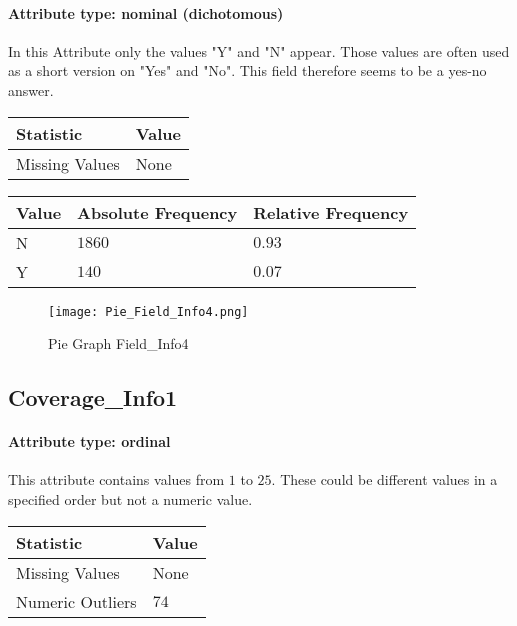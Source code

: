 \paragraph{Attribute type: nominal (dichotomous)} In this Attribute only the values "Y" and "N" appear. Those values are often used as a short version on "Yes" and "No". This field therefore seems to be a yes-no answer.
\qquad
\begin{table}[H]
	\renewcommand{\arraystretch}{1.25}
	\begin{tabular}{l|l}
		\textbf{Statistic} & \textbf{Value}\\\hline
		Missing Values& None\\\hline
	\end{tabular}
\end{table}
\begin{table}[H]
	\renewcommand{\arraystretch}{1.25}
	\begin{tabular}{l|l|l}
		\textbf{Value} & \textbf{Absolute Frequency} & \textbf{Relative Frequency}\\\hline
		N	&$1860$&$0.93$\\\hline
		Y&	$140$&$0.07$
	\end{tabular}
\end{table}

\begin{figure}[H]
	\begin{center}
		\texttt{[image: Pie\_Field\_Info4.png]}
	\end{center}
	\caption{Pie Graph Field\_Info4}
\end{figure}

\subsection{Coverage\_Info1}
\paragraph{Attribute type: ordinal} This attribute contains values from $1$ to $25$.  These could be different values in a specified order but not a numeric value.

\begin{table}[H]
	\renewcommand{\arraystretch}{1.25}
	\begin{tabular}{l|l}
		\textbf{Statistic} & \textbf{Value}\\\hline
		Missing Values& None\\\hline
		Numeric Outliers & $74$
	\end{tabular}
\end{table}

